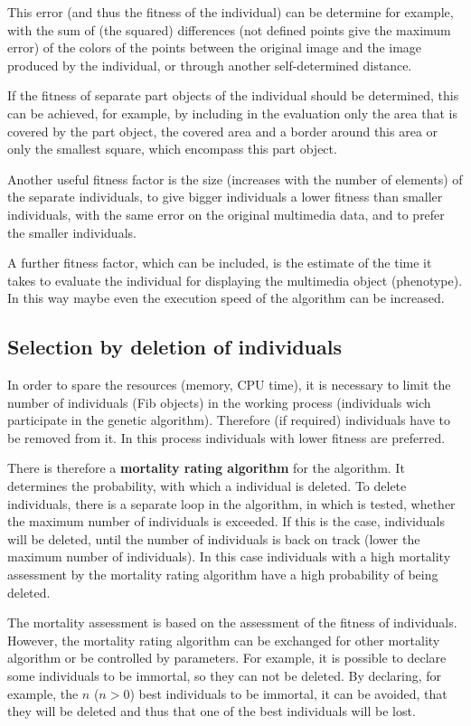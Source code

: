 This error (and thus the fitness of the individual) can be determine for example, with the sum of (the squared) differences (not defined points give the maximum error) of the colors of the points between the original image and the image produced by the individual, or through another self-determined distance.

If the fitness of separate part objects of the individual should be determined, this can be achieved, for example, by including in the evaluation only the area that is covered by the part object, the covered area and a border around this area or only the smallest square, which encompass this part object.

Another useful fitness factor is the size (increases with the number of elements) of the separate individuals, to give bigger individuals a lower fitness than smaller individuals, with the same error on the original multimedia data, and to prefer the smaller individuals.

A further fitness factor, which can be included, is the estimate of the time it takes to evaluate the individual for displaying the multimedia object (phenotype). In this way maybe even the execution speed of the algorithm can be increased.


\subsection{Selection by deletion of individuals}

In order to spare the resources (memory, CPU time), it is necessary to limit the number of individuals (Fib objects) in the working process (individuals wich participate in the genetic algorithm). Therefore (if required) individuals have to be removed from it. In this process individuals with lower fitness are preferred.

There is therefore a \textbf{mortality rating algorithm} for the algorithm. It determines the probability, with which a individual is deleted. To delete individuals, there is a separate loop in the algorithm, in which is tested, whether the maximum number of individuals is exceeded. If this is the case, individuals will be deleted, until the number of individuals is back on track (lower the maximum number of individuals). In this case individuals with a high mortality assessment by the mortality rating algorithm have a high probability of being deleted.

The mortality assessment is based on the assessment of the fitness of individuals. However, the mortality rating algorithm can be exchanged for other mortality algorithm or be controlled by parameters. For example, it is possible to declare some individuals to be immortal, so they can not be deleted. By declaring, for example, the $n$ ($n>0$) best individuals to be immortal, it can be avoided, that they will be deleted and thus that one of the best individuals will be lost.

